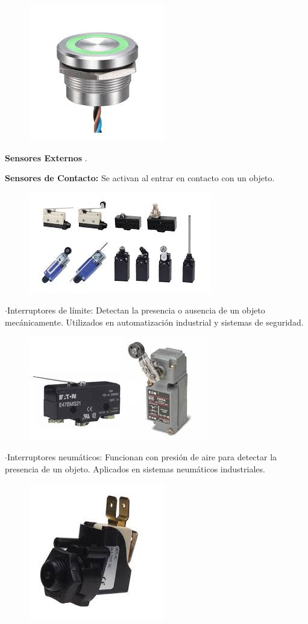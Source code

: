 \begin{figure} [h]
	\centering
	\includegraphics[width=0.3\linewidth]{img/interruptorpiezoelectrico}
	\caption{}
	\label{fig:interruptorpiezoelectrico}
\end{figure}

\newpage
\textbf{Sensores Externos} \cite{bryant2019robotics}.


\textbf{ Sensores de Contacto:}
	Se activan al entrar en contacto con un objeto.


\begin{figure} [h]
	\centering
	\includegraphics[width=0.3\linewidth]{img/sensorcontacto}
	\caption{}
	\label{fig:sensorcontacto}
\end{figure}


	$\cdot$Interruptores de límite: Detectan la presencia o ausencia de un objeto mecánicamente. Utilizados en automatización industrial y sistemas de seguridad.
	
	
\begin{figure} [h]
	\centering
	\includegraphics[width=0.3\linewidth]{img/interruptorlimite}
	\caption{}
	\label{fig:interruptorlimite}
\end{figure}
	
	
	$\cdot$Interruptores neumáticos: Funcionan con presión de aire para detectar la presencia de un objeto. Aplicados en sistemas neumáticos industriales.
	
	
\begin{figure} [h]
	\centering
	\includegraphics[width=0.3\linewidth]{img/interruptorneumaticp}
	\caption{}
	\label{fig:interruptorneumaticp}
\end{figure}
	
